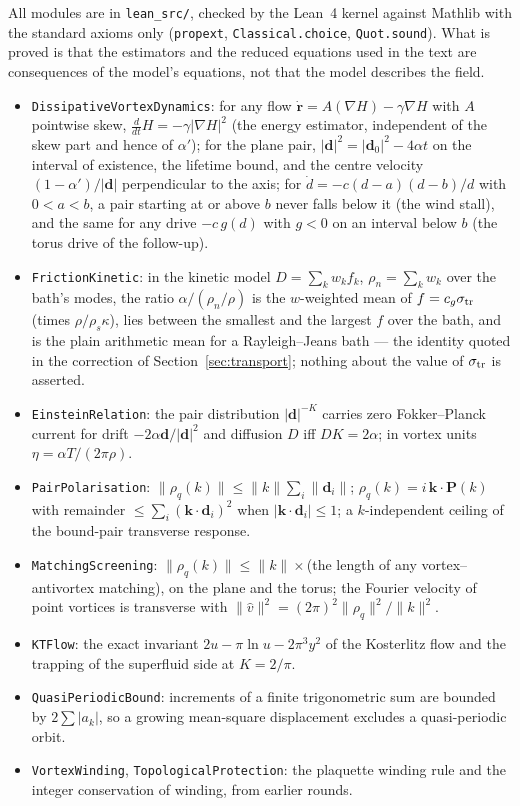 \documentclass[11pt,a4paper]{article}
\newcommand{\lean}[1]{\texttt{\small #1}}
\begin{document}
All modules are in \texttt{lean\_src/}, checked by the Lean~4 kernel against Mathlib with the standard axioms only
(\lean{propext}, \lean{Classical.choice}, \lean{Quot.sound}). What is proved is that the estimators and the reduced
equations used in the text are consequences of the model's equations, not that the model describes the field.
\begin{itemize}[leftmargin=*]
\item \lean{DissipativeVortexDynamics}: for any flow $\dot{\mathbf r}=A(\nabla H)-\gamma\nabla H$ with $A$ pointwise
  skew, $\tfrac{d}{dt}H=-\gamma|\nabla H|^2$ (the energy estimator, independent of the skew part and hence of $\alpha'$);
  for the plane pair, $|\mathbf d|^2=|\mathbf d_0|^2-4\alpha t$ on the interval of existence, the lifetime bound, and the
  centre velocity $(1-\alpha')/|\mathbf d|$ perpendicular to the axis; for $\dot d=-c(d-a)(d-b)/d$ with $0<a<b$, a pair
  starting at or above $b$ never falls below it (the wind stall), and the same for any drive $-c\,g(d)$ with $g<0$ on
  an interval below $b$ (the torus drive of the follow-up).
\item \lean{FrictionKinetic}: in the kinetic model $D=\sum_k w_kf_k$, $\rho_n=\sum_kw_k$ over the bath's modes, the
  ratio $\alpha/(\rho_n/\rho)$ is the $w$-weighted mean of $f=c_g\sigma_{\rm tr}$ (times $\rho/\rho_s\kappa$), lies between
  the smallest and the largest $f$ over the bath, and is the plain arithmetic mean for a Rayleigh--Jeans bath ---
  the identity quoted in the correction of Section~\ref{sec:transport}; nothing about the value of $\sigma_{\rm tr}$ is asserted.
\item \lean{EinsteinRelation}: the pair distribution $|\mathbf d|^{-K}$ carries zero Fokker--Planck current for drift
  $-2\alpha\mathbf d/|\mathbf d|^2$ and diffusion $D$ iff $DK=2\alpha$; in vortex units $\eta=\alpha T/(2\pi\rho)$.
\item \lean{PairPolarisation}: $\|\rho_q(k)\|\le\|k\|\sum_i\|\mathbf d_i\|$; $\rho_q(k)=i\,\mathbf k\cdot\mathbf P(k)$ with
  remainder $\le\sum_i(\mathbf k\cdot\mathbf d_i)^2$ when $|\mathbf k\cdot\mathbf d_i|\le1$; a $k$-independent ceiling of the
  bound-pair transverse response.
\item \lean{MatchingScreening}: $\|\rho_q(k)\|\le\|k\|\times$(the length of any vortex--antivortex matching), on the plane
  and the torus; the Fourier velocity of point vortices is transverse with $\|\hat v\|^2=(2\pi)^2\|\rho_q\|^2/\|k\|^2$.
\item \lean{KTFlow}: the exact invariant $2u-\pi\ln u-2\pi^3y^2$ of the Kosterlitz flow and the trapping of the
  superfluid side at $K=2/\pi$.
\item \lean{QuasiPeriodicBound}: increments of a finite trigonometric sum are bounded by $2\sum|a_k|$, so a growing
  mean-square displacement excludes a quasi-periodic orbit.
\item \lean{VortexWinding}, \lean{TopologicalProtection}: the plaquette winding rule and the integer conservation of
  winding, from earlier rounds.
\end{itemize}
\end{document}
